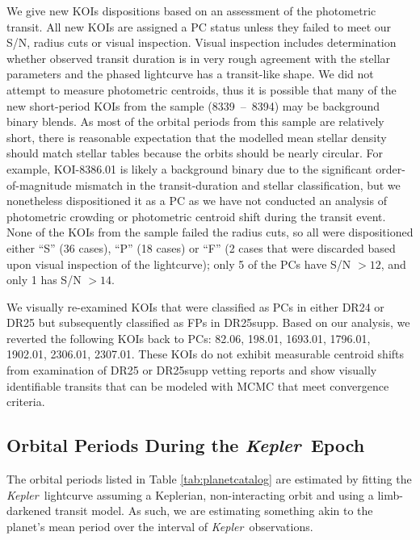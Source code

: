 \documentclass{aastex62}
\newcommand{\ik}{{\it Kepler~}}
\begin{document}
{We give new KOIs dispositions based on an assessment of the photometric transit.  All new KOIs are assigned a PC status unless they failed to meet our S/N, radius cuts or visual inspection.  Visual inspection includes determination whether observed transit duration is in very rough agreement with the stellar parameters and the phased lightcurve has a transit-like shape.  We did not attempt to measure photometric centroids, thus it is possible that many of the new short-period KOIs from the \cite{Caceres:2019} sample (8339~--~8394) may be background binary blends.  As most of the orbital periods from this sample are relatively short, there is reasonable expectation that the modelled mean stellar density should match stellar tables because the orbits should be nearly circular.  For example, KOI-8386.01 is likely a background binary due to the significant order-of-magnitude mismatch in the transit-duration and stellar classification, but we nonetheless dispositioned it as a PC as we have not conducted an analysis of photometric crowding or photometric centroid shift during the transit event. None of the KOIs from the \cite{Caceres:2019} sample failed {the radius cuts, so all were dispositioned either ``S'' (36 cases), ``P'' (18 cases) or ``F'' (2 cases that were discarded based upon visual inspection of the lightcurve); only 5 of the PCs have S/N $> 12$, and only 1 has S/N $> 14$.}} 

We visually re-examined KOIs that were classified as PCs in either DR24 or DR25 but subsequently classified as FPs in DR25supp. %
Based on our analysis, we reverted the following KOIs back to PCs: 82.06, 198.01, 1693.01, 1796.01, 1902.01, 2306.01, 2307.01. These KOIs do not exhibit measurable centroid shifts from examination of DR25 or DR25supp vetting reports and show visually identifiable transits that can be modeled with MCMC that meet convergence criteria.  %

\subsection{Orbital Periods During the \ik Epoch}\label{sec:periods}

The orbital periods listed in Table \ref{tab:planetcatalog} are estimated by fitting the \ik lightcurve assuming a Keplerian, non-interacting orbit and using a limb-darkened transit model. As such, we are estimating something akin to the planet's mean period over the interval of \ik observations. 
\end{document}
